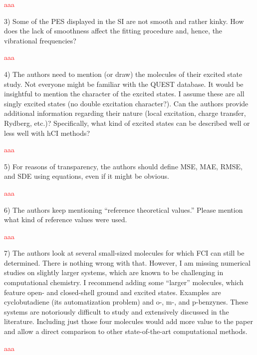 \documentclass[10pt]{letter}
\newcommand{\alert}[1]{\textcolor{red}{#1}}
\begin{document}
\begin{letter}
\alert{
aaa
}

{3) Some of the PES displayed in the SI are not smooth and rather kinky. How does the lack of smoothness affect the fitting procedure and, hence, the vibrational frequencies?
}

\alert{
aaa
}

{4) The authors need to mention (or draw) the molecules of their excited state study. Not everyone might be familiar with the QUEST database. It would be insightful to mention the character of the excited states. I assume these are all singly excited states (no double excitation character?). Can the authors provide additional information regarding their nature (local excitation, charge transfer, Rydberg, etc.)? Specifically, what kind of excited states can be described well or less well with hCI methods?
}

\alert{
aaa
}

{5) For reasons of transparency, the authors should define MSE, MAE, RMSE, and SDE using equations, even if it might be obvious.
}

\alert{
aaa
}

{6) The authors keep mentioning ``reference theoretical values.'' Please mention what kind of reference values were used.
}

\alert{
aaa
}

{7) The authors look at several small-sized molecules for which FCI can still be determined. There is nothing wrong with that. However, I am missing numerical studies on slightly larger systems, which are known to be challenging in computational chemistry. I recommend adding some ``larger'' molecules, which feature open- and closed-shell ground and excited states. Examples are cyclobutadiene (its automatization problem) and o-, m-, and p-benzynes. These systems are notoriously difficult to study and extensively discussed in the literature. Including just those four molecules would add more value to the paper and allow a direct comparison to other state-of-the-art computational methods.
}

\alert{
aaa
}

\end{letter}
\end{document}
